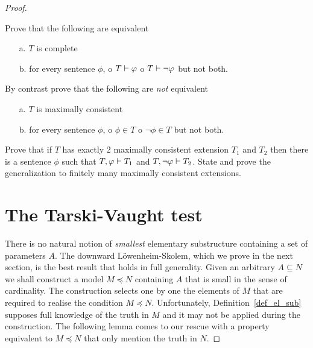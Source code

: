 \begin{proof}
\begin{exercise}\label{ex_max_cons_compl}
Prove that the following are equivalent
\begin{itemize}
\item[a.] $T$ is complete
\item[b.] for every sentence $\phi$, o $T\vdash\varphi$ o  $T\vdash\neg\varphi$ but not both.
\end{itemize}
By contrast prove that the following are \textit{not\/} equivalent
\begin{itemize}
\item[a.] $T$ is maximally consistent
\item[b.] for every sentence $\phi$, o $\phi\in T$ o  $\neg\phi\in T$ but not both.
\end{itemize}
\end{exercise}

\begin{exercise}\label{ex_2max_cons_ext}
Prove that if $T$ has exactly $2$ maximally consistent extension $T_1$ and $T_2$ then there is a sentence $\phi$ such that $T,\varphi\vdash T_1$ and $T,\neg\varphi\vdash T_2$.
State and prove the generalization to finitely many maximally consistent extensions.
\end{exercise} 




\section{The Tarski-Vaught test}

There is no natural notion of \textit{smallest\/} elementary substructure containing a set of parameters $A$.
The downward L\"owenheim-Skolem, which we prove in the next section, is the best result that holds in full generality.
Given an arbitrary $A\subseteq N$ we shall construct a model $M\preceq N$ containing $A$ that is small in the sense of cardinality.
The construction selects one by one the elements of $M$ that are required to realise the condition $M\preceq N$.
Unfortunately, Definition~\ref{def_el_sub} supposes full knowledge of the truth in $M$ and it may not be applied during the construction.
The following lemma comes to our rescue with a property equivalent to $M\preceq N$ that only mention the truth in $N$.


\end{proof}

